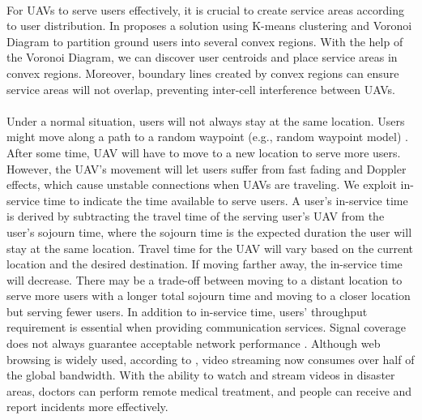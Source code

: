 \documentclass[a4paper,12pt]{report}
\begin{document}
\paragraph{}
For UAVs to serve users effectively, it is crucial to create service areas according to user distribution. In \cite{b9} proposes a solution using K-means clustering and Voronoi Diagram to partition ground users into several convex regions. With the help of the Voronoi Diagram, we can discover user centroids and place service areas in convex regions. Moreover, boundary lines created by convex regions can ensure service areas will not overlap, preventing inter-cell interference between UAVs.
\paragraph{}
Under a normal situation, users will not always stay at the same location. Users might move along a path to a random waypoint (e.g., random waypoint model) \cite{b10}. After some time, UAV will have to move to a new location to serve more users. However, the UAV's movement will let users suffer from fast fading and Doppler effects, which cause unstable connections when UAVs are traveling. We exploit in-service time \cite{b11} to indicate the time available to serve users. A user's in-service time is derived by subtracting the travel time of the serving user's UAV from the user's sojourn time, where the sojourn time is the expected duration the user will stay at the same location. Travel time for the UAV will vary based on the current location and the desired destination. If moving farther away, the in-service time will decrease. There may be a trade-off between moving to a distant location to serve more users with a longer total sojourn time and moving to a closer location but serving fewer users. In addition to in-service time, users' throughput requirement is essential when providing communication services. Signal coverage does not always guarantee acceptable network performance \cite{b12}. Although web browsing is widely used, according to \cite{b13}, video streaming now consumes over half of the global bandwidth. With the ability to watch and stream videos in disaster areas, doctors can perform remote medical treatment, and people can receive and report incidents more effectively.
\end{document}
